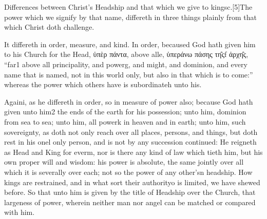 Differences between Christ’s Headship and that which we give to kingsc.[5]The power which we signify by that name, differeth in three things plainly from that which Christ doth challenge.

It differeth in order, measure, and kind. In order, becaused God hath given him to his Church for the Head, ὑπὲρ πάντα, above alle, ὑπεράνω πάσης τη̑ςf ἀρχη̑ς, “far1 above all principality, and powerg, and might, and dominion, and every name that is named, not in this world only, but also in that which is to come:” whereas the power which others have is subordinateh unto his.

Againi, as he differeth in order, so in measure of power also; because God hath given unto him2 the ends of the earth for his possession; unto him, dominion from sea to sea; unto him, all powerk in heaven and in earth; unto him, such sovereignty, as doth not only reach over all places, persons, and things, but doth rest in his onel only person, and is not by any succession continued: He reigneth as Head and King for everm, nor is there any kind of law which tieth him, but his own proper will and wisdom: his power is absolute, the same jointly over all which it is severally over each; not so the power of any other’sn headship. How kings are restrained, and in what sort their authorityo is limited, we have shewed before. So that unto him is given by the title of Headship over the Church, that largeness of power, wherein neither man nor angel can be matched or compared with him.

